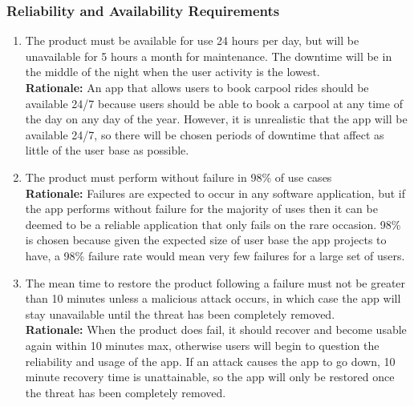 \documentclass[]{article}
\begin{document}
\subsubsection{Reliability and Availability Requirements}
\label{ssub:reliability_and_availability_requirements}
\begin{enumerate}[{PR-RA}1. ]
	\item The product must be available for use 24 hours per day, but will be unavailable for 5 hours a month for maintenance. The downtime will be in the middle of the night when the user activity is the lowest. \\
	{\bf Rationale:} An app that allows users to book carpool rides should be available 24/7 because users should be able to book a carpool at any time of the day on any day of the year. However, it is unrealistic that the app will be available 24/7, so there will be chosen periods of downtime that affect as little of the user base as possible.
	\item The product must perform without failure in 98\% of use cases \\
	{\bf Rationale:} Failures are expected to occur in any software application, but if the app performs without failure for the majority of uses then it can be deemed to be a reliable application that only fails on the rare occasion. 98\% is chosen because given the expected size of user base the app projects to have, a 98\% failure rate would mean very few failures for a large set of users.
	\item The mean time to restore the product following a failure must not be greater than 10 minutes unless a malicious attack occurs, in which case the app will stay unavailable until the threat has been completely removed. \\
	{\bf Rationale:} When the product does fail, it should recover and become usable again within 10 minutes max, otherwise users will begin to question the reliability and usage of the app. If an attack causes the app to go down, 10 minute recovery time is unattainable, so the app will only be restored once the threat has been completely removed.
\end{enumerate}
\end{document}

